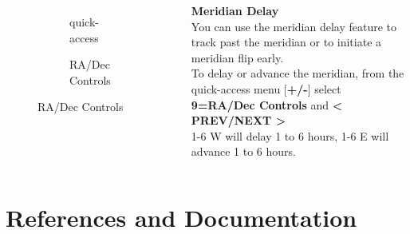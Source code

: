 
\begin{frame}[t]{\insertsubsectionhead}
    \begin{columns}[T]
      \begin{figure}[ht]
          \begin{subfigure}{0.67\textwidth}
          \caption{quick-access}
        \end{subfigure}
        \vspace{\fill}
        \begin{subfigure}{0.67\textwidth}
          \caption{RA/Dec Controls}
        \end{subfigure}
      \end{figure}
    \textbf{Meridian Delay} \\[0.25ex]

    You can use the meridian delay feature to track past the meridian or to
    initiate a meridian flip early. \\[1ex]

    To delay or advance the meridian, from the quick-access menu
    [\textbf{+/-}] select \textbf{9=RA/Dec Controls} and \textbf{\textless
    PREV/NEXT \textgreater} \\[1ex]

    1-6 W will delay 1 to 6 hours, 1-6 E will advance 1 to 6 hours.
  \end{columns}
\end{frame}






\section{References and Documentation}

